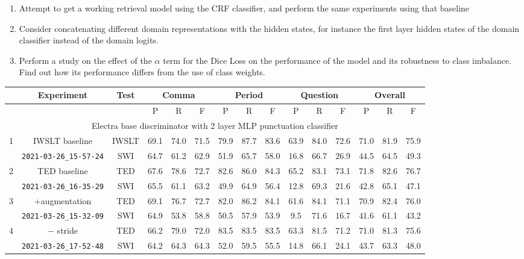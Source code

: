 \documentclass[a4paper]{article}
\begin{document}
\begin{multicols}{2}
\begin{enumerate}
    \item Attempt to get a working retrieval model using the CRF classifier, and perform the same experiments using that baseline
    
    \item Consider concatenating different domain representations with the hidden states, for instance the first layer hidden states of the domain classifier instead of the domain logits.
    
    \item Perform a study on the effect of the $\alpha$ term for the Dice Loss on the performance of the model and its robustness to class imbalance. Find out how its performance differs from the use of class weights. 
    
\end{enumerate}


\begin{table*}[t]
\centering
\begin{tabular}{|c|c|c|c c c|c c c|c c c|c c c|}
\hline
 &Experiment & Test & \multicolumn{3}{|c|}{Comma} & \multicolumn{3}{|c|}{Period} & \multicolumn{3}{|c|}{Question} & \multicolumn{3}{|c|}{Overall}\\
 \hline
 &&&P&R&F&P&R&F&P&R&F&P&R&F\\
 \hline

\multicolumn{15}{|c|}{Electra base discriminator with 2 layer MLP punctuation classifier}\\\hline
\multirow{2}{*}{1}&
IWSLT baseline&IWSLT&69.1&74.0&71.5&79.9&87.7&83.6&63.9&84.0&72.6&71.0&81.9&75.9\\
&\verb|2021-03-26_15-57-24|&SWI&64.7&61.2&62.9&51.9&65.7&58.0&16.8&66.7&26.9&44.5&64.5&49.3\\\hline

\multirow{2}{*}{2}&
TED baseline&TED&67.6&78.6&72.7&82.6&86.0&84.3&65.2&83.1&73.1&71.8&82.6&76.7\\&
\verb|2021-03-26_16-35-29|&SWI&65.5&61.1&63.2&49.9&64.9&56.4&12.8&69.3&21.6&42.8&65.1&47.1\\\hline
\multirow{2}{*}{3}&
+augmentation&TED&69.1&76.7&72.7&82.0&86.2&84.1&61.6&84.1&71.1&70.9&82.4&76.0\\&
\verb|2021-03-26_15-32-09|&SWI&64.9&53.8&58.8&50.5&57.9&53.9& 9.5&71.6&16.7&41.6&61.1&43.2\\\hline

\multirow{2}{*}{4}&
$-$ stride&TED&66.2&79.0&72.0&83.5&83.5&83.5&63.3&81.5&71.2&71.0&81.3&75.6\\&
\verb|2021-03-26_17-52-48|&SWI&64.2&64.3&64.3&52.0&59.5&55.5&14.8&66.1&24.1&43.7&63.3&48.0\\\hline


\end{tabular}
\end{table*}
\end{multicols}
\end{document}
